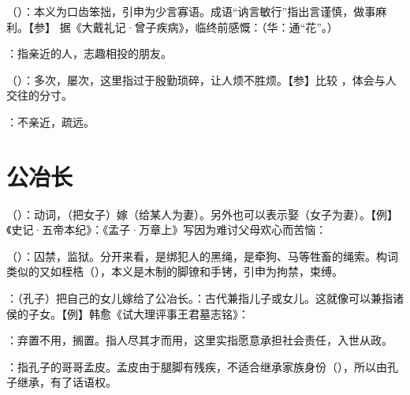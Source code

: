 {
\item {}（）：本义为口齿笨拙，引申为少言寡语。成语“讷言敏行”指出言谨慎，做事麻利。【参】 据《大戴礼记·曾子疾病》，临终前感慨：（华：通“花”。）
}
{}


{
\item {}：指亲近的人，志趣相投的朋友。
}
{}


{
\item {}（）：多次，屡次，这里指过于殷勤琐碎，让人烦不胜烦。【参】比较 ，体会与人交往的分寸。
\item {}：不亲近，疏远。
}
{}



\chapter{公冶长}

{
\item {}（）：动词，（把女子）嫁（给某人为妻）。另外也可以表示娶（女子为妻）。【例】《史记·五帝本纪》：《孟子·万章上》写因为难讨父母欢心而苦恼：
\item {}（）：囚禁，监狱。分开来看，是绑犯人的黑绳，是牵狗、马等牲畜的绳索。构词类似的又如桎梏（），本义是木制的脚镣和手铐，引申为拘禁，束缚。
\item {}：（孔子）把自己的女儿嫁给了公冶长。：古代兼指儿子或女儿。这就像可以兼指诸侯的子女。【例】韩愈《试大理评事王君墓志铭》：
}
{}


{
\item {}：弃置不用，搁置。指人尽其才而用，这里实指愿意承担社会责任，入世从政。
\item {}：指孔子的哥哥孟皮。孟皮由于腿脚有残疾，不适合继承家族身份（），所以由孔子继承，有了话语权。%
}
{}  %


